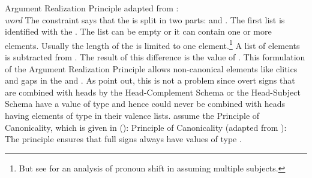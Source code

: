 \documentclass[output=paper
 	        ,biblatex
                ,babelshorthands
                ,newtxmath
                ,draftmode
                ,colorlinks, citecolor=brown
]{langscibook}
\begin{document}
%
\ea\label{ARP} 
Argument Realization Principle adapted from :\\
\emph{word} \impl
{}
\z
The constraint says that the \argstl is split in two parts:  and . The first list is
identified with the \subjl. The list can be empty or it can contain one or more elements. Usually
the length of the \subjl is limited to one element.\footnote{
But see  for an analysis of pronoun shift in  assuming multiple subjects.
} A list of  elements is
subtracted from . The result of this difference is the value of \comps. This formulation of
the Argument Realization Principle allows non-canonical elements like clitics and gaps in the \subj
and \compsl. As \citet[]{GSag2000a-u} point out, this is not a problem since overt signs that are
combined with heads by the Head-Complement Schema or the Head-Subject Schema have a \synsem value of
type  and hence could never be combined with heads having elements of
type  in their valence lists. \citet[]{GSag2000a-u} assume the Principle
of Canonicality, which is given in ():
\ea
Principle of Canonicality (adapted from \citealt[]{GSag2000a-u}):\\
 \impl {}
\z
The principle ensures that full signs always have \synsem values of type .
\end{document}
